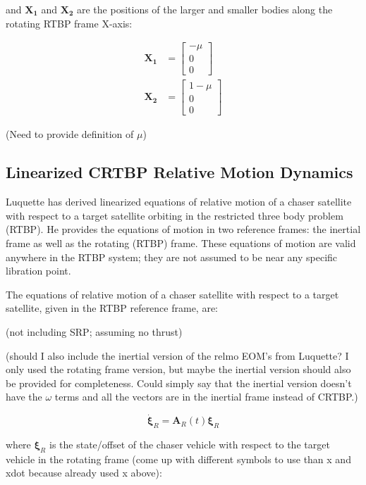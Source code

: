 \documentclass[a4paper]{article}
\begin{document}
and \(\mathbf{X_1}\) and \(\mathbf{X_2}\) are the positions of the larger and smaller bodies along the rotating RTBP frame X-axis:

\begin{equation*}
\begin{aligned}
\mathbf{X_1} &= \begin{bmatrix}
						-\mu \\ 0 \\ 0 
						\end{bmatrix} \\
\mathbf{X_2} &= \begin{bmatrix}
						1 - \mu \\ 0 \\ 0
						\end{bmatrix}
\end{aligned}
\end{equation*}

(Need to provide definition of \(\mu\))

\subsection{Linearized CRTBP Relative Motion Dynamics}
Luquette \cite{luquette2004} has derived linearized equations of relative motion of a chaser satellite with respect to a target satellite orbiting in the restricted three body problem (RTBP).  He provides the equations of motion in two reference frames: the inertial frame as well as the rotating (RTBP) frame.  These equations of motion are valid anywhere in the RTBP system; they are not assumed to be near any specific libration point.

The equations of relative motion of a chaser satellite with respect to a target satellite, given in the RTBP reference frame, are:

(not including SRP; assuming no thrust)

(should I also include the inertial version of the relmo EOM's from Luquette?  I only used the rotating frame version, but maybe the inertial version should also be provided for completeness.  Could simply say that the inertial version doesn't have the \(\omega\) terms and all the vectors are in the inertial frame instead of CRTBP.)

\begin{equation} \label{eq:RelmoDerivs}
\dot{\boldsymbol{\xi}}_R = \mathbf{A}_R(t)\boldsymbol{\xi}_R
\end{equation}

where \(\boldsymbol{\xi}_R\) is the state/offset of the chaser vehicle with respect to the target vehicle in the rotating frame (come up with different symbols to use than x and xdot because already used x above):
\end{document}
